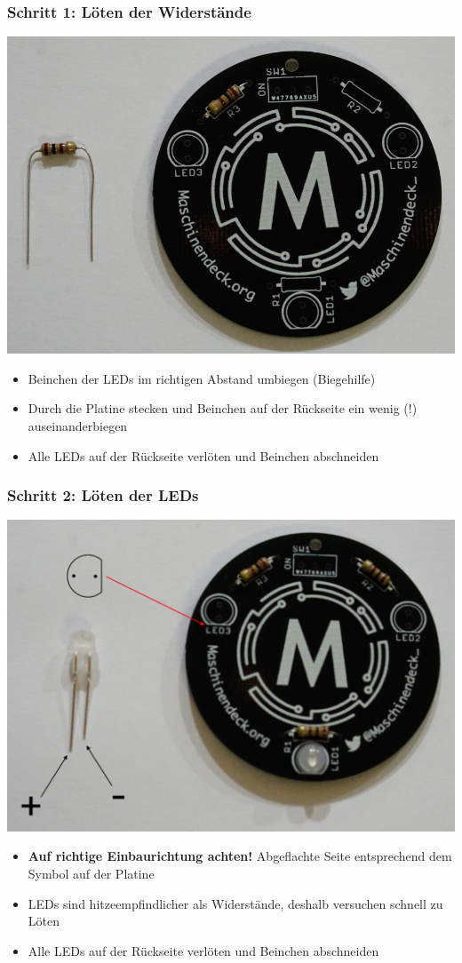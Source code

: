 \documentclass[10pt]{beamer}
\begin{document}

	\begin{frame}
		\frametitle{Schritt 1: Löten der Widerstände}
		\centering \includegraphics[width=.6\linewidth]{images/step1.png}
		\begin{itemize}
			\item Beinchen der LEDs im richtigen Abstand umbiegen (Biegehilfe)
			\item Durch die Platine stecken und Beinchen auf der Rückseite ein wenig (!) auseinanderbiegen 
			\item Alle LEDs auf der Rückseite verlöten und Beinchen abschneiden			
		\end{itemize}		
	\end{frame}
	
	\begin{frame}
		\frametitle{Schritt 2: Löten der LEDs}
		\centering \includegraphics[width=.6\linewidth]{images/step2.png}
		\begin{itemize}
			\item \textbf{Auf richtige Einbaurichtung achten!} Abgeflachte Seite entsprechend dem Symbol auf der Platine
			\item LEDs sind hitzeempfindlicher als Widerstände, deshalb versuchen schnell zu Löten
			\item Alle LEDs auf der Rückseite verlöten und Beinchen abschneiden			
		\end{itemize}
	\end{frame}
\end{document}
